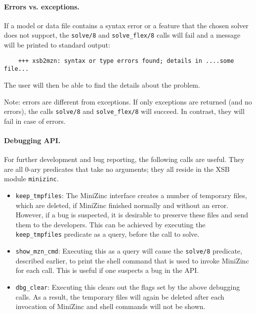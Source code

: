 \paragraph{Errors vs. exceptions.}
If a model or data file contains a syntax error or a feature that the
chosen solver does not support, the \texttt{solve/8} and
\texttt{solve\_flex/8} calls will fail and a message will be printed to
standard output:
\begin{verbatim}
    +++ xsb2mzn: syntax or type errors found; details in ....some file...
\end{verbatim}
The user will then be able to find the details about the problem.

Note: errors are different from exceptions. If only exceptions are returned
(and no errors), the calls \texttt{solve/8} and \texttt{solve\_flex/8} will
succeed. In contrast, they will fail in case of errors.

\paragraph{Debugging API.}
For further development and bug reporting, the following calls are useful.
They are all 0-ary predicates that take no arguments; they all reside in the
XSB module \texttt{minizinc}. 
\begin{itemize}
\item  \texttt{keep\_tmpfiles}: The MiniZinc interface creates a number of
  temporary files, which are deleted, if MiniZinc finished normally and
  without an error. However, if a bug is suspected, it is desirable to
  preserve these files and send them to the developers. 
  This can be achieved by executing the \texttt{keep\_tmpfiles} predicate
  as a query, before the call to solve.
\item \texttt{show\_mzn\_cmd}: Executing this as a query will cause the
  \texttt{solve/8} predicate, described earlier, to print the shell command
  that is used to invoke MiniZinc for each call.
  This is useful if one suspects a bug in the API.
\item \texttt{dbg\_clear}: Executing this clears out the flags set by the
  above debugging calls. As a result, the temporary files will again be
  deleted after each invocation of MiniZinc and shell commands will not be
  shown.
\end{itemize}



